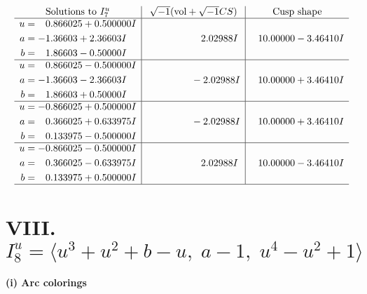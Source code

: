\documentclass[1p]{elsarticle_modified}
\theoremstyle{definition}
\newcommand{\I}{\sqrt{-1}}
\begin{document}
$$\begin{array}{c|c|c}  
\text{Solutions to }I^u_{7}& \I (\text{vol} + \sqrt{-1}CS) & \text{Cusp shape}\\
 \hline 
\begin{aligned}
u &= \phantom{-}0.866025 + 0.500000 I \\
a &= -1.36603 + 2.36603 I \\
b &= \phantom{-}1.86603 - 0.50000 I\end{aligned}
 & \phantom{-0.000000 -}2.02988 I & \phantom{-}10.00000 - 3.46410 I \\ \hline\begin{aligned}
u &= \phantom{-}0.866025 - 0.500000 I \\
a &= -1.36603 - 2.36603 I \\
b &= \phantom{-}1.86603 + 0.50000 I\end{aligned}
 & \phantom{-0.000000 } -2.02988 I & \phantom{-}10.00000 + 3.46410 I \\ \hline\begin{aligned}
u &= -0.866025 + 0.500000 I \\
a &= \phantom{-}0.366025 + 0.633975 I \\
b &= \phantom{-}0.133975 - 0.500000 I\end{aligned}
 & \phantom{-0.000000 } -2.02988 I & \phantom{-}10.00000 + 3.46410 I \\ \hline\begin{aligned}
u &= -0.866025 - 0.500000 I \\
a &= \phantom{-}0.366025 - 0.633975 I \\
b &= \phantom{-}0.133975 + 0.500000 I\end{aligned}
 & \phantom{-0.000000 -}2.02988 I & \phantom{-}10.00000 - 3.46410 I\\
 \hline 
 \end{array}$$\newpage\newpage\renewcommand{\arraystretch}{1}
\centering \section*{VIII. $I^u_{8}= \langle u^3+u^2+b- u,\;a-1,\;u^4- u^2+1 \rangle$}
\flushleft \textbf{(i) Arc colorings}\\
\end{document}
